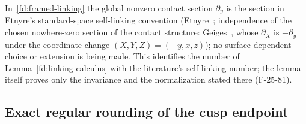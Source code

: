 \begin{remark}\label{rem:sl-convention}
In~\eqref{fd:framed-linking} the global nonzero contact section
$\partial_y$ is the section in Etnyre's standard-space self-linking
convention (Etnyre~\cite[Sections~2.6.3--2.6.4, p.~15]{Etnyre};
independence of the chosen nowhere-zero section of the contact structure:
Geiges~\cite[Definition~3.2 and the following paragraph, p.~45]{GeigesContact},
whose $\partial_X$ is $-\partial_y$ under the coordinate change
$(X,Y,Z)=(-y,x,z)$); no surface-dependent choice or extension is being
made. This identifies the number of Lemma~\ref{fd:linking-calculus} with
the literature's self-linking number; the lemma itself proves only the
invariance and the normalization stated there (F-25-81).
\end{remark}


\subsection{Exact regular rounding of the cusp endpoint}
\label{ce:geometry}

